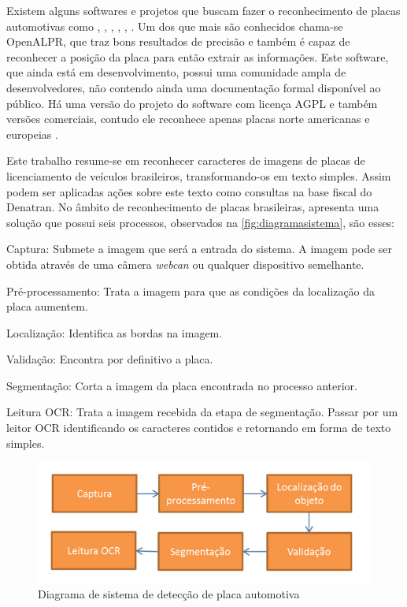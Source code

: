 Existem alguns softwares e projetos que buscam fazer o reconhecimento de placas automotivas como \cite{openalpr}, \cite{licenseplaterecognition}, \cite{GOCR}, \cite{chang2004automatic}, \cite{hegt1998high}, \cite{nijhuis1995car}. Um dos que mais são conhecidos chama-se OpenALPR, que traz bons resultados de precisão e também é capaz de reconhecer a posição da placa para então extrair as informações. Este software, que ainda está em desenvolvimento, possui uma comunidade ampla de desenvolvedores, não contendo ainda uma documentação formal disponível ao público. Há uma versão do projeto do software com licença AGPL e também versões comerciais, contudo ele reconhece apenas placas norte americanas e europeias \cite{openalpr}.

Este trabalho resume-se em reconhecer caracteres de imagens de placas de licenciamento de veículos brasileiros, transformando-os em texto simples. Assim podem ser aplicadas ações sobre este texto como consultas na base fiscal do Denatran. No âmbito de reconhecimento de placas brasileiras,  apresenta uma solução que possui seis processos, observados na \autoref{fig:diagramasistema}, são esses:

\begin{alineas}
\item Captura: Submete a imagem que será a entrada do sistema. A imagem pode ser obtida através de uma câmera \textit{webcan} ou qualquer dispositivo semelhante. 
\item Pré-processamento: Trata a imagem para que as condições da localização da placa aumentem.
\item Localização: Identifica as bordas na imagem.
\item Validação: Encontra por definitivo a placa.
\item Segmentação: Corta a imagem da placa encontrada no processo anterior.
\item Leitura OCR: Trata a imagem recebida da etapa de segmentação. Passar por um leitor OCR identificando os caracteres contidos e retornando em forma de texto simples. 
\end{alineas}

\begin{figure}[htbp]
\caption{\label{fig:diagramasistema}Diagrama de sistema de detecção de placa automotiva}
\begin{center}
\includegraphics[width=.9\textwidth]{figuras/f1c1.png}
\end{center}
\end{figure}


